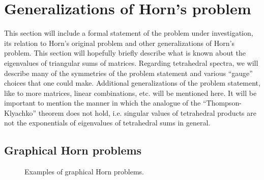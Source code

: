 \documentclass[notitlepage, 10pt]{article}
\begin{document}
\section{Generalizations of Horn's problem}
{\color{blue}
    This section will include a formal statement of the problem under investigation, its relation to Horn's original problem and other generalizations of Horn's problem.
    This section will hopefully briefly describe what is known about the eigenvalues of triangular sums of matrices.
    Regarding tetrahedral spectra, we will describe many of the symmetries of the problem statement and various ``gauge'' choices that one could make.
    Additional generalizations of the problem statement, like to more matrices, linear combinations, etc. will be mentioned here.
    It will be important to mention the manner in which the analogue of the ``Thompson-Klyachko'' theorem does not hold, i.e. singular values of tetrahedral products are not the exponentials of eigenvalues of tetrahedral sums in general.
}

\subsection{Graphical Horn problems}
\label{sec:linear_eigenvalue_constraint_problems}

\begin{center}
    \begin{figure}
        \caption{Examples of graphical Horn problems.}
    \end{figure}
\end{center}
\end{document}
